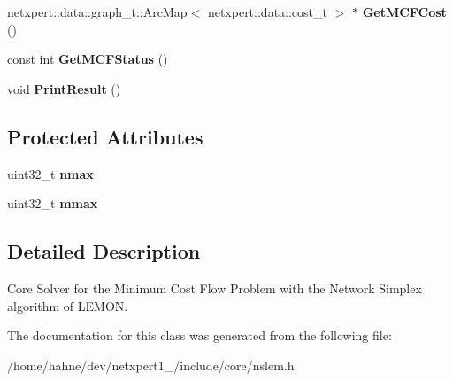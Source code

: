 \begin{DoxyCompactItemize}
\item 
netxpert\+::data\+::graph\+\_\+t\+::\+Arc\+Map$<$ netxpert\+::data\+::cost\+\_\+t $>$ $\ast$ {\bfseries Get\+M\+C\+F\+Cost} ()\hypertarget{classnetxpert_1_1core_1_1NS__LEM_aa93b64efcb6242a9222d6ecb0146eef8}{}\label{classnetxpert_1_1core_1_1NS__LEM_aa93b64efcb6242a9222d6ecb0146eef8}

\item 
const int {\bfseries Get\+M\+C\+F\+Status} ()\hypertarget{classnetxpert_1_1core_1_1NS__LEM_ad94b6da1ebbf367b903f178ea6f8df01}{}\label{classnetxpert_1_1core_1_1NS__LEM_ad94b6da1ebbf367b903f178ea6f8df01}

\item 
void {\bfseries Print\+Result} ()\hypertarget{classnetxpert_1_1core_1_1NS__LEM_abf5de9e17e749ff12935439a833968da}{}\label{classnetxpert_1_1core_1_1NS__LEM_abf5de9e17e749ff12935439a833968da}

\end{DoxyCompactItemize}
\subsection*{Protected Attributes}
\begin{DoxyCompactItemize}
\item 
uint32\+\_\+t {\bfseries nmax}\hypertarget{classnetxpert_1_1core_1_1NS__LEM_a7d9ac4a6d045532e29d4485d2a3e2c87}{}\label{classnetxpert_1_1core_1_1NS__LEM_a7d9ac4a6d045532e29d4485d2a3e2c87}

\item 
uint32\+\_\+t {\bfseries mmax}\hypertarget{classnetxpert_1_1core_1_1NS__LEM_a1782bde4d1fbcef5ce6ce937cebc9d0e}{}\label{classnetxpert_1_1core_1_1NS__LEM_a1782bde4d1fbcef5ce6ce937cebc9d0e}

\end{DoxyCompactItemize}


\subsection{Detailed Description}
Core Solver for the Minimum Cost Flow Problem with the Network Simplex algorithm of L\+E\+M\+ON. 

The documentation for this class was generated from the following file\+:\begin{DoxyCompactItemize}
\item 
/home/hahne/dev/netxpert1\+\_/include/core/nslem.\+h\end{DoxyCompactItemize}
